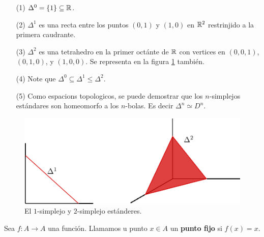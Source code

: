 \begin{example}\label{exmp_2}
    \begin{enumerate}
        \item[(1)] $\Delta^0=\{1\} \subseteq \mathbb{R}$.

        \item[(2)] $\Delta^1$ es una recta entre los puntos $(0,1)$ y $(1,0)$ en
            $\mathbb{R}^2$ restrinjido a la primera caudrante.

        \item[(3)] $\Delta^2$ es una tetrahedro en la primer oct\'ante de  $\mathbb{R}$
            con vertices en  $(0,0,1)$, $(0,1,0)$, y $(1,0,0)$. Se representa en
            la figura \ref{fig_1} tambi\'en.

        \item[(4)] Note que $\Delta^0 \subseteq \Delta^1 \leq \Delta^2$.

        \item[(5)] Como espacions topologicos, se puede demostrar que los
            $n$-simplejos est\'andares son homeomorfo a los  $n$-bolas. Es decir
             $\Delta^n \simeq D^n$.
    \end{enumerate}
\end{example}

\begin{figure}[h]
    \centering
    \includegraphics[scale=0.5]{Figures/standaard_simplices.eps}
    \caption{El $1$-simplejo y  $2$-simplejo est\'anderes.}
    \label{fig_1}
\end{figure}

\begin{definition}
    Sea $f:A \rightarrow A$ una funci\'on. Llamamos u punto $x \in A$ un
    \textbf{punto fijo} si $f(x)=x$.
\end{definition}

